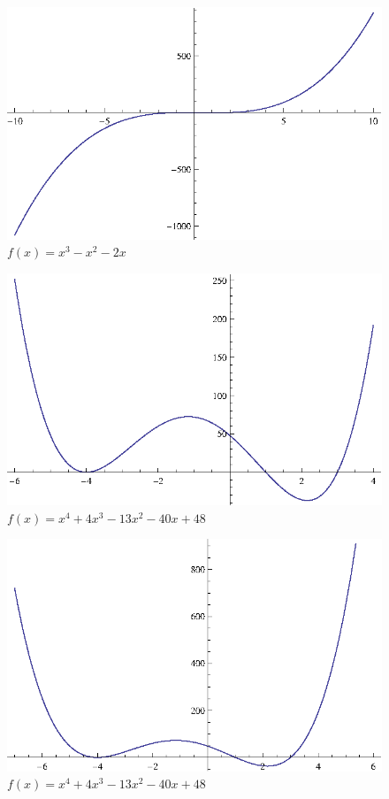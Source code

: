 \documentclass{article}
\begin{document}
  \begin{figure}[H]
    \centering
    \includegraphics[scale=0.7]{zoom14.eps}
    \caption*{$f(x) = x^3 - x^2 - 2x$}
  \end{figure}

  \begin{figure}[H]
    \centering
    \includegraphics[scale=0.7]{zoom01.eps}
    \caption*{$f(x) = x^4 + 4x^3 - 13x^2 - 40x + 48$}
  \end{figure}

  \begin{figure}[H]
    \centering
    \includegraphics[scale=0.7]{zoom02.eps}
    \caption*{$f(x) = x^4 + 4x^3 - 13x^2 - 40x + 48$}
  \end{figure}
\end{document}
